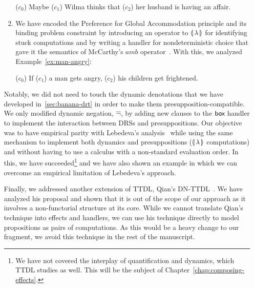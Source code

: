 \begin{enumerate}
  \begin{exe}
     ($c_0$) Maybe ($c_1$) Wilma thinks that ($c_2$) her husband is having an affair.
  \end{exe}

\item \label{item:pga-amb} We have encoded the Preference for Global
  Accommodation principle and its binding problem constraint by introducing
  an operator to $\llparenthesis \, \lambda \, \rrparenthesis$ for identifying stuck computations and
  by writing a handler for nondeterministic choice that gave it the
  semantics of McCarthy's $amb$ operator~\cite{mccarthy1961basis}. With
  this, we analyzed Example~\ref{ex:man-angry}:

  \begin{exe}
     ($c_0$) If ($c_1$) a man gets angry, ($c_2$) his
    children get frightened.
  \end{exe}
\end{enumerate}

Notably, we did not need to touch the dynamic denotations that we have
developed in~\ref{sec:banana-drt} in order to make them
presupposition-compatible. We only modified dynamic negation, $\mathop{\overline{\lnot}}$, by
adding new clauses to the $\textsf{box}$ handler to implement the interaction
between DRSs and presuppositions. Our objective was to have empirical
parity with Lebedeva's analysis~\cite{lebedeva2012expression} while using
the same mechanism to implement both dynamics and presuppositions (${\llparenthesis \, \lambda \, \rrparenthesis}$
computations) and without having to use a calculus with a non-standard
evaluation order. In this, we have succeeded\footnote{We have not covered
  the interplay of quantification and dynamics, which TTDL studies as
  well. This will be the subject of Chapter~\ref{chap:composing-effects}.}
and we have also shown an example in which we can overcome an empirical
limitation of Lebedeva's approach.

Finally, we addressed another extension of TTDL, Qian's
DN-TTDL~\cite{qian2014accessibility}. We have analyzed his proposal and
shown that it is out of the scope of our approach as it involves a
non-functorial structure at its core. While we cannot translate Qian's
technique into effects and handlers, we can use his technique directly to
model propositions as pairs of computations. As this would be a heavy
change to our fragment, we avoid this technique in the rest of the
manuscript.

